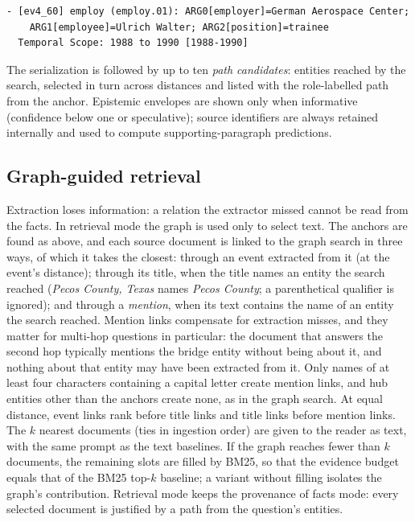 \documentclass[preprint,12pt,authoryear]{elsarticle}
\begin{document}
\begin{lstlisting}
- [ev4_60] employ (employ.01): ARG0[employer]=German Aerospace Center;
    ARG1[employee]=Ulrich Walter; ARG2[position]=trainee
  Temporal Scope: 1988 to 1990 [1988-1990]
\end{lstlisting}

The serialization is followed by up to ten \emph{path candidates}: entities reached by the search, selected in turn across distances and listed with the role-labelled path from the anchor.
Epistemic envelopes are shown only when informative (confidence below one or speculative); source identifiers are always retained internally and used to compute supporting-paragraph predictions.

\subsection{Graph-guided retrieval}
\label{sec:retrieval}

Extraction loses information: a relation the extractor missed cannot be read from the facts.
In retrieval mode the graph is used only to select text.
The anchors are found as above, and each source document is linked to the graph search in three ways, of which it takes the closest: through an event extracted from it (at the event's distance); through its title, when the title names an entity the search reached (\textit{Pecos County, Texas} names \textit{Pecos County}; a parenthetical qualifier is ignored); and through a \emph{mention}, when its text contains the name of an entity the search reached.
Mention links compensate for extraction misses, and they matter for multi-hop questions in particular: the document that answers the second hop typically mentions the bridge entity without being about it, and nothing about that entity may have been extracted from it.
Only names of at least four characters containing a capital letter create mention links, and hub entities other than the anchors create none, as in the graph search.
At equal distance, event links rank before title links and title links before mention links.
The $k$ nearest documents (ties in ingestion order) are given to the reader as text, with the same prompt as the text baselines.
If the graph reaches fewer than $k$ documents, the remaining slots are filled by BM25, so that the evidence budget equals that of the BM25 top-$k$ baseline; a variant without filling isolates the graph's contribution.
Retrieval mode keeps the provenance of facts mode: every selected document is justified by a path from the question's entities.
\end{document}
